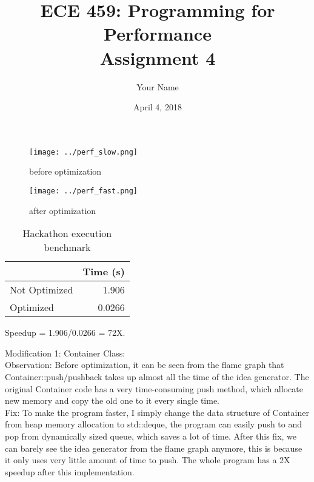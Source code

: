 \documentclass[12pt]{article}
\title{ECE 459: Programming for Performance\\Assignment 4}
\author{Your Name}
\date{April 4, 2018}
\begin{document}
\maketitle


\begin{figure}[h]
\centering
\texttt{[image: ../perf\_slow.png]}
\caption{before optimization}
\end{figure}

\begin{figure}[h]
\centering
\texttt{[image: ../perf\_fast.png]}
\caption{after optimization}
\end{figure}

\begin{table}[H]
  \centering
  \begin{tabular}{lr}
    & {\bf Time (s)} \\
    \hline
    Not Optimized & 1.906 \\
    Optimized & 0.0266 \\
  \end{tabular}
  \caption{Hackathon execution benchmark}
  \label{tbl-zeta-openmp}
\end{table}

Speedup = 1.906/0.0266 = 72X.\\
\newline %




\noindent Modification 1: Container Class:\\

\indent Observation: Before optimization, it can be seen from the flame graph that Container::push/push\textunderscore back takes up almost all the time of the idea generator. The original Container code has a very time-consuming push method, which allocate new memory and copy the old one to it every single time.\\

\indent Fix: To make the program faster, I simply change the data structure of Container from heap memory allocation to std::deque, the program can easily push to and pop from dynamically sized queue, which saves a lot of time. After this fix, we can barely see the idea generator from the flame graph anymore, this is because it only uses very little amount of time to push. The whole program has a 2X speedup after this implementation. 
\newline %
\end{document}

